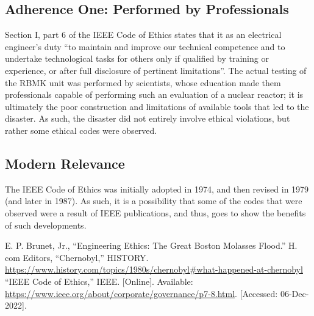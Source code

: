 \documentclass[conference]{IEEEtran}
\begin{document}
\subsection{Adherence One: Performed by Professionals}

Section I, part 6 of the IEEE Code of Ethics \cite{b3} states that it as an electrical engineer's duty ``to maintain and improve our technical competence and to undertake technological tasks for others only if qualified by training or experience, or after full disclosure of pertinent limitations''. The actual testing of the RBMK unit was performed by scientists, whose education made them professionals capable of performing such an evaluation of a nuclear reactor; it is ultimately the poor construction and limitations of available tools that led to the disaster. As such, the disaster did not entirely involve ethical violations, but rather some ethical codes were observed. 

\subsection{Modern Relevance}

The IEEE Code of Ethics was initially adopted in 1974, and then revised in 1979 (and later in 1987). As such, it is a possibility that some of the codes that were observed were a result of IEEE publications, and thus, goes to show the benefits of such developments.

\begin{thebibliography}{00}
 E. P. Brunet, Jr., “Engineering Ethics: The Great Boston Molasses Flood.”
 H. com Editors, “Chernobyl,” HISTORY. \href{https://www.history.com/topics/1980s/chernobyl#what-happened-at-chernobyl}{https://www.history.com/topics/1980s/chernobyl#what-happened-at-chernobyl}
 “IEEE Code of Ethics,” IEEE. [Online]. Available: \href{https://www.ieee.org/about/corporate/governance/p7-8.html}{https://www.ieee.org/about/corporate/governance/p7-8.html}. [Accessed: 06-Dec-2022]. 
\end{thebibliography}
\end{document}
